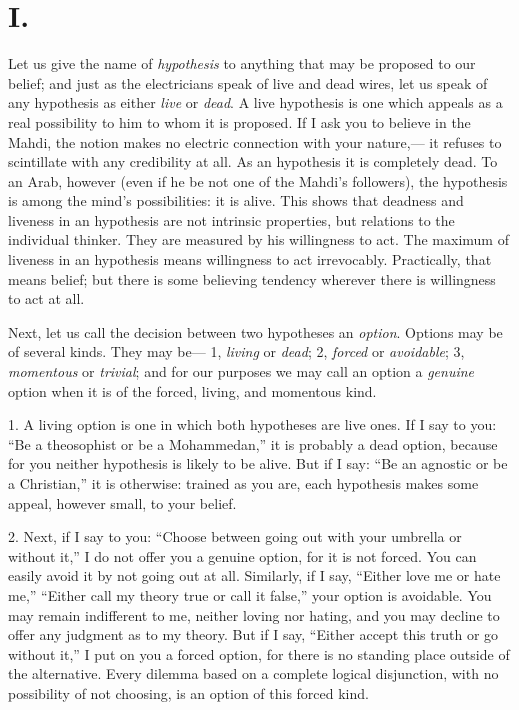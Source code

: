\documentclass[12pt]{article}
\begin{document}
\section*{I.}

Let us give the name of \emph{hypothesis} to anything that may be proposed to our belief; and just as the electricians speak of live and dead wires, let us speak of any hypothesis as either \emph{live} or \emph{dead}.  A live hypothesis is one which appeals as a real possibility to him to whom it is proposed.  If I ask you to believe in the Mahdi, the notion makes no electric connection with your nature,--- it refuses to scintillate with any credibility at all.  As an hypothesis it is completely dead.  To an Arab, however (even if he be not one of the Mahdi's followers), the hypothesis is among the mind's possibilities: it is alive.  This shows that deadness and liveness in an hypothesis are not intrinsic properties, but relations to the  individual thinker.  They are measured by his willingness to act.  The maximum of liveness in an hypothesis means willingness to act irrevocably. Practically, that means belief; but there is some believing tendency wherever there is willingness to act at all.

Next, let us call the decision between two hypotheses an \emph{option}. Options may be of several kinds.  They may be--- 1, \emph{living} or \emph{dead}; 2, \emph{forced} or \emph{avoidable}; 3, \emph{momentous} or \emph{trivial}; and for our purposes we may call an option a \emph{genuine} option when it is of the forced, living, and momentous kind.

1.  A living option is one in which both hypotheses are live ones.  If I say to you: ``Be a theosophist or be a Mohammedan,'' it is probably a dead option, because for you neither hypothesis is likely to be alive. But if I say: ``Be an agnostic or be a Christian,'' it is otherwise: trained as you are, each hypothesis makes some appeal, however small, to your belief.

2.  Next, if I say to you: ``Choose between going out with your umbrella or without it,'' I do not offer you a genuine option, for it is not forced.  You can easily avoid it by not going out at all.  Similarly, if I say, ``Either love me or hate me,'' ``Either call my theory true or call it false,'' your option is avoidable.  You may remain indifferent to me, neither loving nor hating, and you may decline to offer any judgment as to my theory.  But if I say, ``Either accept this truth or go without it,'' I put on you a forced option, for there is no standing place outside of the alternative.  Every dilemma based on a complete logical disjunction, with no possibility of not choosing, is an option of this forced kind.
\end{document}

